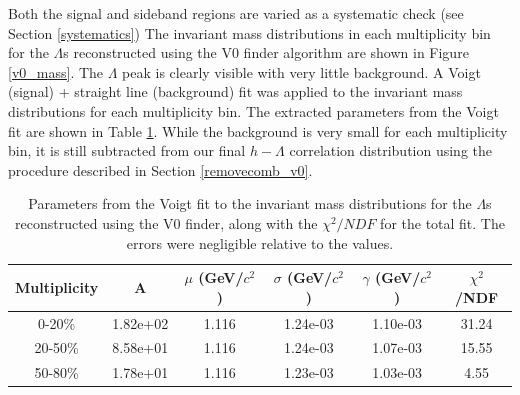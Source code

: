 \documentclass[ALICE,manyauthors]{ALICE_analysis_notes}
\begin{document}
Both the signal and sideband regions are varied as a systematic check (see Section \ref{systematics})
The invariant mass distributions in each multiplicity bin for the $\Lambda$s reconstructed using the V0 finder algorithm are shown in Figure \ref{v0_mass}. The $\Lambda$ peak is clearly visible with very little background. A Voigt (signal) + straight line (background) fit was applied to the invariant mass distributions for each multiplicity bin. The extracted parameters from the Voigt fit are shown in Table \ref{voigt_parameters}. While the background is very small for each multiplicity bin, it is still subtracted from our final $h-\Lambda$ correlation distribution using the procedure described in Section \ref{removecomb_v0}.

\begin{table}[h!]
    \centering
\begin{tabular}{| c | c | c | c | c | c | }
\hline
Multiplicity & A & $\mu$ (GeV/$c^2$) & $\sigma$ (GeV/$c^2$) & $\gamma$ (GeV/$c^2$) & $\chi^2$/NDF \\
\hline
0-20\% & 1.82e+02  & 1.116 & 1.24e-03 & 1.10e-03 & 31.24\\
20-50\% & 8.58e+01 & 1.116 & 1.24e-03 & 1.07e-03 & 15.55\\
50-80\% & 1.78e+01 & 1.116 & 1.23e-03 & 1.03e-03 & 4.55\\
\hline
\end{tabular}
\caption{Parameters from the Voigt fit to the invariant mass distributions for the $\Lambda$s reconstructed using the V0 finder, along with the $\chi^2/NDF$ for the total fit. The errors were negligible relative to the values.}
\label{voigt_parameters}
\end{table}

\clearpage
 
\end{document}
